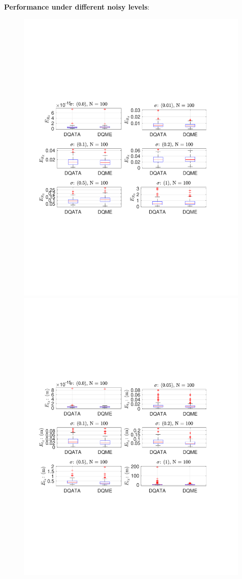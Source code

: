 \textbf{Performance under different noisy levels}:
\begin{figure}
\centering
\includegraphics[scale=0.6]{./hand_eye_figures/dq/dq_er_cmp_noise}
\includegraphics[scale=0.6]{./hand_eye_figures/dq/dq_et_cmp_noise}

\end{figure}
